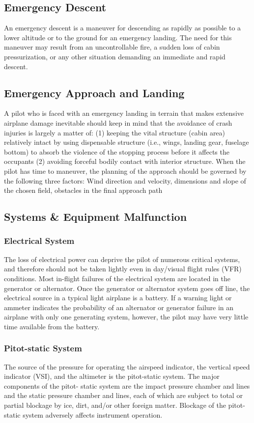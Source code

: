 \documentclass[12pt]{article}
\begin{document}
	\subsection{Emergency Descent}
		An emergency descent is a maneuver for descending as rapidly as possible to a lower altitude or to the ground for an emergency landing. The need for this maneuver may result from an uncontrollable fire, a sudden loss of cabin pressurization, or any other situation demanding an immediate and rapid descent. 
	\subsection{Emergency Approach and Landing}
		A pilot who is faced with an emergency landing in terrain that makes extensive airplane damage inevitable should keep in mind that the avoidance of crash injuries is largely a matter of: (1) keeping the vital structure (cabin area) relatively intact by using dispensable structure (i.e., wings, landing gear, fuselage bottom) to absorb the violence of the stopping process before it affects the occupants (2) avoiding forceful bodily contact with interior structure. 
		When the pilot has time to maneuver, the planning of the approach should be governed by the following three factors: Wind direction and velocity, dimensions and slope of the chosen field, obstacles in the final approach path
	\subsection{Systems \& Equipment Malfunction}
		\subsubsection{Electrical System}
			The loss of electrical power can deprive the pilot of numerous critical systems, and therefore should not be taken lightly even in day/visual flight rules (VFR) conditions. Most in-flight failures of the electrical system are located in the generator or alternator. Once the generator or alternator system goes off line, the electrical source in a typical light airplane is a battery. If a warning light or ammeter indicates the probability of an alternator or generator failure in an airplane with only one generating system, however, the pilot may have very little time available from the battery.
		\subsubsection{Pitot-static System}
			The source of the pressure for operating the airspeed indicator, the vertical speed indicator (VSI), and the altimeter is the pitot-static system. The major components of the pitot- static system are the impact pressure chamber and lines and the static pressure chamber and lines, each of which are subject to total or partial blockage by ice, dirt, and/or other foreign matter. Blockage of the pitot-static system adversely affects instrument operation. 
\end{document}
